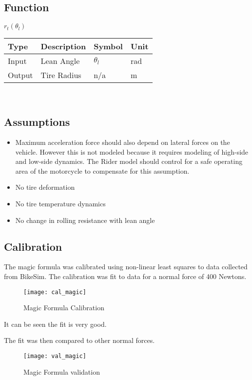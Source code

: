 \documentclass[../SimBALink.tex]{subfiles}
\begin{document}
\subsection{Function}
$r_t(\theta_l)$ \\
	\begin{tabular}{ l | l | l | l }
		Type				& Description		&	Symbol		&	Unit		\\	\hline
		Input 				& Lean Angle		&	$\theta_l$  & 	rad		\\
		Output 				& Tire Radius		&	n/a			&	m
	\end{tabular} \\

\subsection{Assumptions}
\begin{itemize}
  \item Maximum acceleration force should also depend on lateral forces on the vehicle. However this is not modeled because it requires modeling of high-side and low-side dynamics. The Rider model should control for a safe operating area of the motorcycle to compensate for this assumption. 
  \item No tire deformation
  \item No tire temperature dynamics
  \item No change in rolling resistance with lean angle 
\end{itemize}

\subsection{Calibration}
The magic formula was calibrated using non-linear least squares to data collected from BikeSim. The calibration was fit to data for a normal force of 400 Newtons.

\begin{figure}[H]
\center
 \texttt{[image: cal\_magic]}
  \caption{Magic Formula Calibration}
\end{figure}

It can be seen the fit is very good.

The fit was then compared to other normal forces.

\begin{figure}[H]
\center
 \texttt{[image: val\_magic]}
  \caption{Magic Formula validation}
\end{figure}
\end{document}
